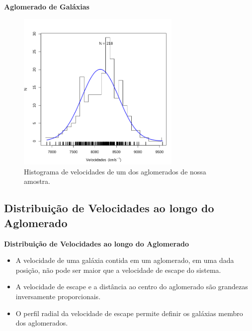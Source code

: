 \documentclass[xcolor=dvipsnames,10pt]{beamer}
\begin{document}
\begin{frame}{\textbf{Aglomerado de Galáxias}}
\begin{figure}[!htbp] %
\begin{center}
\includegraphics[height=0.6\textheight,width=0.7\textwidth]{10043dist}%
\caption{\scriptsize{Histograma de velocidades de um dos aglomerados de nossa amostra.}}
\label{fig1}%
\end{center}
\end{figure}  
\end{frame}

\subsection{Distribuição de Velocidades ao longo do Aglomerado}
\begin{frame}{\textbf{Distribuição de Velocidades ao longo do Aglomerado}}
\begin{itemize}
\item A velocidade de uma galáxia contida em um aglomerado, em uma dada posição, não pode ser maior que a velocidade de escape do sistema.
\item A velocidade de escape e a distância ao centro do aglomerado são grandezas inversamente proporcionais. 
\item O  perfil radial da velocidade de escape permite definir os galáxias membro dos aglomerados.
\end{itemize} 
\end{frame}
\end{document}
